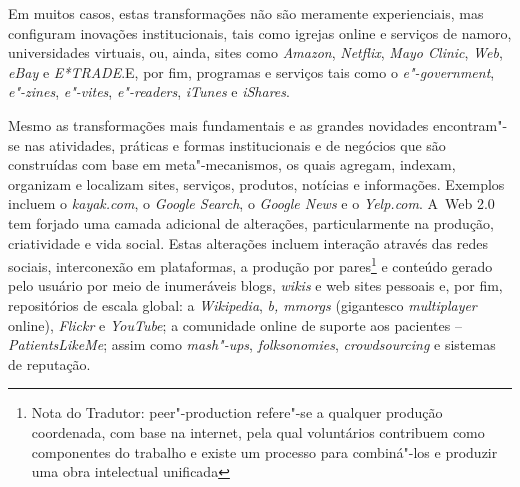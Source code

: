Em muitos casos, estas transformações não são meramente experienciais,
mas configuram inovações institucionais, tais como igrejas online e
serviços de namoro, universidades virtuais, ou, ainda, sites como
\emph{Amazon}, \emph{Netflix}, \emph{Mayo Clinic}, \emph{Web},
\emph{eBay} e \emph{E*TRADE}.E, por fim, programas e serviços tais como
o \emph{e"-government}, \emph{e"-zines}, \emph{e"-vites}, \emph{e"-readers},
\emph{iTunes} e \emph{iShares}.

Mesmo as transformações mais fundamentais e as grandes novidades
encontram"-se nas atividades, práticas e formas institucionais e de
negócios que são construídas com base em meta"-mecanismos, os quais
agregam, indexam, organizam e localizam sites, serviços, produtos,
notícias e informações. Exemplos incluem o \emph{kayak.com}, o
\emph{Google Search}, o \emph{Google News} e o \emph{Yelp.com}. A~Web
2.0 tem forjado uma camada adicional de alterações, particularmente na
produção, criatividade e vida social. Estas alterações incluem interação
através das redes sociais, interconexão em plataformas, a produção por
pares\footnote{Nota do Tradutor: peer"-production refere"-se a qualquer
  produção coordenada, com base na internet, pela qual voluntários
  contribuem como componentes do trabalho e existe um processo para
  combiná"-los e produzir uma obra intelectual unificada} e conteúdo
gerado pelo usuário por meio de inumeráveis blogs, \emph{wikis} e web
sites pessoais e, por fim, repositórios de escala global: a
\emph{Wikipedia}, \emph{b, mmorgs} (gigantesco \emph{multiplayer}
online), \emph{Flickr} e \emph{YouTube}; a comunidade online de suporte
aos pacientes -- \emph{PatientsLikeMe}; assim como \emph{mash"-ups},
\emph{folksonomies}, \emph{crowdsourcing} e sistemas de reputação.

